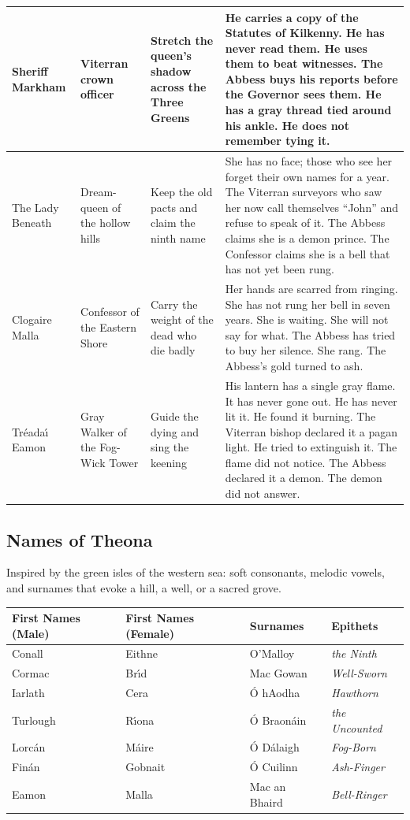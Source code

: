 \begin{longtable}{|p{}|p{}|p{}|p{}|}
\hline
Sheriff Markham & Viterran crown officer & Stretch the queen's shadow across the Three Greens & He carries a copy of the Statutes of Kilkenny. He has never read them. He uses them to beat witnesses. The Abbess buys his reports before the Governor sees them. He has a gray thread tied around his ankle. He does not remember tying it. \\
\hline
The Lady Beneath & Dream-queen of the hollow hills & Keep the old pacts and claim the ninth name & She has no face; those who see her forget their own names for a year. The Viterran surveyors who saw her now call themselves ``John'' and refuse to speak of it. The Abbess claims she is a demon prince. The Confessor claims she is a bell that has not yet been rung. \\
\hline
Clogaire Malla & Confessor of the Eastern Shore & Carry the weight of the dead who die badly & Her hands are scarred from ringing. She has not rung her bell in seven years. She is waiting. She will not say for what. The Abbess has tried to buy her silence. She rang. The Abbess's gold turned to ash. \\
\hline
Tr\'eada\'{\i} Eamon & Gray Walker of the Fog-Wick Tower & Guide the dying and sing the keening & His lantern has a single gray flame. It has never gone out. He has never lit it. He found it burning. The Viterran bishop declared it a pagan light. He tried to extinguish it. The flame did not notice. The Abbess declared it a demon. The demon did not answer. \\
\hline
\end{longtable}

\subsection*{Names of Theona}
\label{sec:theona-names}

Inspired by the green isles of the western sea: soft consonants, melodic vowels, and surnames that evoke a hill, a well, or a sacred grove.

\begin{longtable}{|p{}|p{}|p{}|p{}|}
\hline
\textbf{First Names (Male)} & \textbf{First Names (Female)} & \textbf{Surnames} & \textbf{Epithets} \\
\hline
Conall & Eithne & O'Malloy & \textit{the Ninth} \\
\hline
Cormac & Br\'{\i}d & Mac Gowan & \textit{Well-Sworn} \\
\hline
Iarlath & Cera & \'{O} hAodha & \textit{Hawthorn} \\
\hline
Turlough & R\'{\i}ona & \'{O} Braon\'{a}in & \textit{the Uncounted} \\
\hline
Lorc\'{a}n & M\'{a}ire & \'{O} D\'{a}laigh & \textit{Fog-Born} \\
\hline
Fin\'{a}n & Gobnait & \'{O} Cuilinn & \textit{Ash-Finger} \\
\hline
Eamon & Malla & Mac an Bhaird & \textit{Bell-Ringer} \\
\hline
\end{longtable}


